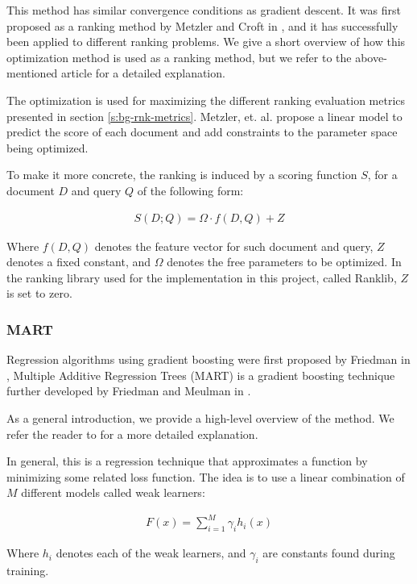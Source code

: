 This method has similar convergence conditions as gradient descent. It was first proposed as a
ranking method by Metzler and Croft in \cite{Metzler2006LinearFM}, and it has successfully been applied
to different ranking problems. We give a short overview of how this optimization method is used as
a ranking method, but we refer to the above-mentioned article for a detailed explanation.

The optimization is used for maximizing the different ranking evaluation metrics presented in section \ref{s:bg-rnk-metrics}.
Metzler, et. al. propose a linear model to predict the score of each document and add constraints to the parameter space being optimized.

To make it more concrete, the ranking is induced by a scoring function $S$, for a document $D$ and query $Q$
 of the following form:

\begin{align*}
S(D; Q) = \Omega \cdot f(D, Q) + Z
\end{align*}

Where $f(D, Q)$ denotes the feature vector for such document and query, $Z$ denotes a fixed constant, and $\Omega$
denotes the free parameters to be optimized. In the ranking library used for the implementation in this project, called Ranklib, $Z$ is set to zero.


\subsubsection{MART}
Regression algorithms using gradient boosting were first proposed by Friedman in \cite{Friedman2001GreedyFA},
Multiple Additive Regression Trees (MART) is a gradient boosting technique further developed by Friedman and
Meulman in \cite{Friedman2003MultipleAR}.

As a general introduction, we provide a high-level overview of the method. We refer the reader to \cite{Friedman2001GreedyFA} 
for a more detailed explanation.

In general, this is a regression technique that approximates a function by minimizing some related loss 
function. The idea is to use a linear combination of $M$ different models called weak learners:

\begin{align*}
F(x) = \sum_{i=1}^M \gamma_i h_i(x)
\end{align*}

Where $h_i$ denotes each of the weak learners, and $\gamma_i$ are constants found during training.

